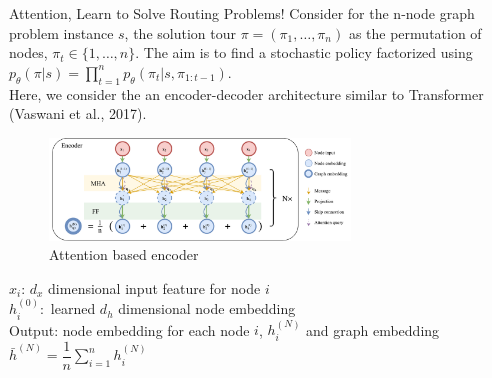 \documentclass[9pt]{beamer}
\begin{document}
\begin{frame}{Attention, Learn to Solve Routing Problems!}
Consider for the n-node graph problem instance $s$, the solution tour $\pi = (\pi_1,\ldots,\pi_n)$ as the permutation of nodes, $\pi_t\in\{1,\ldots,n\}$. The aim is to find a stochastic policy factorized using $p_\theta(\pi|s)=\prod_{t=1}^n p_\theta(\pi_t|s,\pi_{1:t-1})$.
\bigskip\\
Here, we consider the an encoder-decoder architecture similar to Transformer (Vaswani et al., 2017).
\begin{figure}[H]
    \centering
    \includegraphics[width=8cm]{images/Encoder.pdf}
    \caption{Attention based encoder}
    \label{fig:my_label}
\end{figure}
$x_i$: $d_x$ dimensional input feature for node $i$\\
$h_i^{(0)}:$ learned $d_h$ dimensional node embedding\\
Output: node embedding for each node $i$, $h_i^{(N)}$ and graph embedding $\bar h ^{(N)}=\dfrac{1}{n}\sum_{i=1}^n h_i^{(N)}$
\end{frame}
\end{document}
